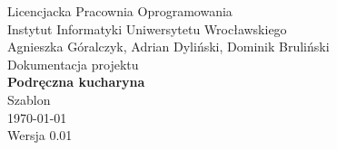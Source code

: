 \documentclass[12pt,leqno, twoside]{mwart}
\begin{document}
\thispagestyle{empty}
\begin{center}
Licencjacka Pracownia Oprogramowania \\ Instytut
Informatyki Uniwersytetu Wrocławskiego \\
\vspace{4cm}
\Large Agnieszka Góralczyk, Adrian Dyliński, Dominik Bruliński \\
\vspace{0.5cm}
\huge Dokumentacja projektu\\ \textbf{Podręczna kucharyna}\\ \Large Szablon\\
\vspace{1cm}
\normalsize \today \\
\vspace{2cm}
\normalsize Wersja 0.01
\end{center}

\newpage
\end{document}

